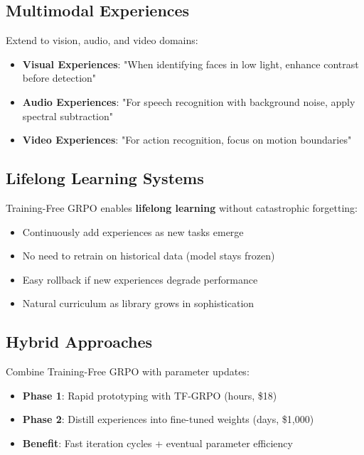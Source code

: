 \documentclass[11pt,a4paper]{article}
\begin{document}
\subsection{Multimodal Experiences}

Extend to vision, audio, and video domains:

\begin{itemize}
    \item \textbf{Visual Experiences}: "When identifying faces in low light, enhance contrast before detection"
    \item \textbf{Audio Experiences}: "For speech recognition with background noise, apply spectral subtraction"
    \item \textbf{Video Experiences}: "For action recognition, focus on motion boundaries"
\end{itemize}

\subsection{Lifelong Learning Systems}

Training-Free GRPO enables \textbf{lifelong learning} without catastrophic forgetting:

\begin{itemize}
    \item Continuously add experiences as new tasks emerge
    \item No need to retrain on historical data (model stays frozen)
    \item Easy rollback if new experiences degrade performance
    \item Natural curriculum as library grows in sophistication
\end{itemize}

\subsection{Hybrid Approaches}

Combine Training-Free GRPO with parameter updates:

\begin{itemize}
    \item \textbf{Phase 1}: Rapid prototyping with TF-GRPO (hours, \$18)
    \item \textbf{Phase 2}: Distill experiences into fine-tuned weights (days, \$1,000)
    \item \textbf{Benefit}: Fast iteration cycles + eventual parameter efficiency
\end{itemize}
\end{document}
